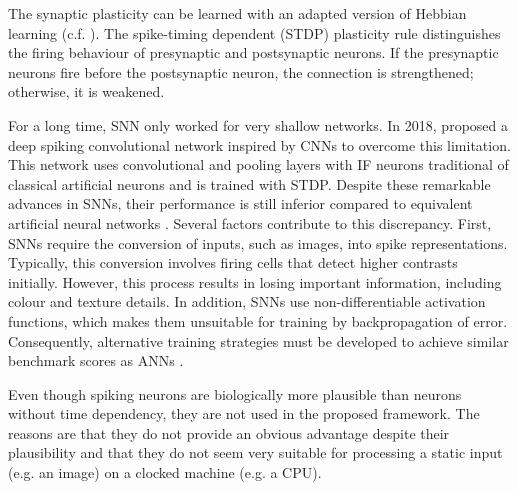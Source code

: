 The synaptic plasticity can be learned with an adapted version of Hebbian learning (c.f. ).
The spike-timing dependent (STDP) plasticity rule  distinguishes the firing behaviour of presynaptic and postsynaptic neurons.
If the presynaptic neurons fire before the postsynaptic neuron, the connection is strengthened; otherwise, it is weakened.

For a long time, SNN only worked for very shallow networks.
In 2018,  proposed a deep spiking convolutional network inspired by CNNs to overcome this limitation.
This network uses convolutional and pooling layers with IF neurons traditional of classical artificial neurons and is trained with STDP.
Despite these remarkable advances in SNNs, their performance is still inferior compared to equivalent artificial neural networks . Several factors contribute to this discrepancy. First, SNNs require the conversion of inputs, such as images, into spike representations.
Typically, this conversion involves firing cells that detect higher contrasts initially. 
However, this process results in losing important information, including colour and texture details. In addition, SNNs use non-differentiable activation functions, which makes them unsuitable for training by backpropagation of error. Consequently, alternative training strategies must be developed to achieve similar benchmark scores as ANNs \cite{nunes_spiking_2022}.

Even though spiking neurons are biologically more plausible than neurons without time dependency, they are not used in the proposed framework.
The reasons are that they do not provide an obvious advantage despite their plausibility and that they do not seem very suitable for processing a static input (e.g. an image) on a clocked machine (e.g. a CPU).


